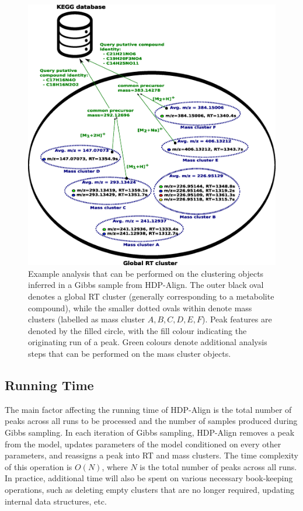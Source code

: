 \begin{figure}
\centering\includegraphics[width=1\columnwidth]{05-hdp/figures/figure_7.eps}
\centering\caption{\label{fig:metabolomic_results_annotations}Example analysis that can be performed on the clustering objects inferred in a Gibbs sample from HDP-Align. The outer black oval denotes a global RT cluster (generally corresponding to a metabolite compound), while the smaller dotted ovals within denote mass clusters (labelled as mass cluster $A,B,C,D,E,F$). Peak features are denoted by the filled circle, with the fill colour indicating the originating run of a peak. Green colours denote additional analysis steps that can be performed on the mass cluster objects.}
\end{figure}

\subsection{Running Time}
\label{sub:running-time}

The main factor affecting the running time of HDP-Align is the total number of peaks across all runs to be processed and the number of samples produced during Gibbs sampling. In each iteration of Gibbs sampling, HDP-Align removes a peak from the model, updates parameters of the model conditioned on every other parameters, and reassigns a peak into RT and mass clusters. The time complexity of this operation is $O(N)$, where $N$ is the total number of peaks across all runs. In practice, additional time will also be spent on various necessary book-keeping operations, such as deleting empty clusters that are no longer required, updating internal data structures, etc. 


